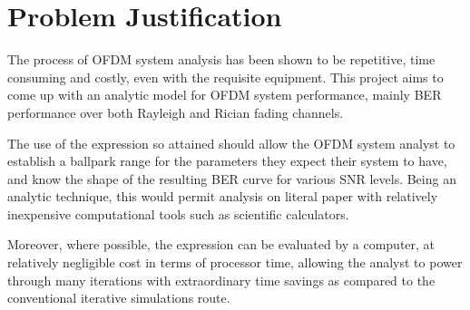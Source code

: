 
\section{Problem Justification}
The process of \gls{OFDM} system analysis has been shown to be repetitive, time consuming and costly, even with the requisite equipment. This project aims to come up with an analytic model for \gls{OFDM} system performance, mainly \gls{BER} performance over both Rayleigh and Rician fading channels.

The use of the expression so attained should allow the \gls{OFDM} system analyst to establish a ballpark range for the parameters they expect their system to have, and know the shape of the resulting \gls{BER} curve for various \gls{SNR} levels. Being an analytic technique, this would permit analysis on literal paper with relatively inexpensive computational tools such as scientific calculators.

Moreover, where possible, the expression can be evaluated by a computer, at relatively negligible cost in terms of processor time, allowing the analyst to power through many iterations with extraordinary time savings as compared to the conventional iterative simulations route.